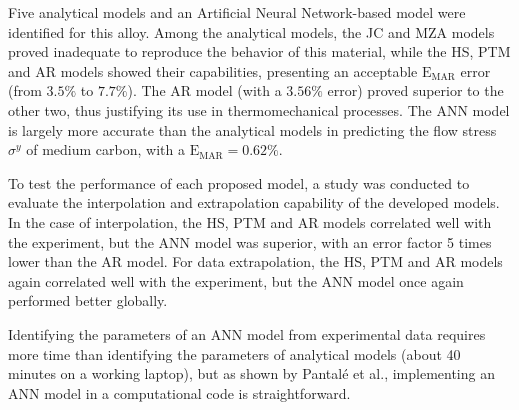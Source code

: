 \documentclass[metals,article,submit,pdftex,moreauthors]{Definitions/mdpi}
\makeatletter
\DeclareRobustCommand{\eal}{et al.\@\xspace}
\DeclareRobustCommand{\MARE}{\text{E}_\text{MAR}}
\makeatother
\begin{document}
Five analytical models and an Artificial Neural Network-based model were identified for this alloy.
Among the analytical models, the JC and MZA models proved inadequate to reproduce the behavior of this material, while the HS, PTM and AR models showed their capabilities, presenting an acceptable $\MARE$ error (from $3.5\%$ to $7.7\%$).
The AR model (with a $3.56\%$ error) proved superior to the other two, thus justifying its use in thermomechanical processes.
The ANN model is largely more accurate than the analytical models in predicting the flow stress $\sigma^y$ of medium carbon, with a $\MARE=0.62\%$.

To test the performance of each proposed model, a study was conducted to evaluate the interpolation and extrapolation capability of the developed models.
In the case of interpolation, the HS, PTM and AR models correlated well with the experiment, but the ANN model was superior, with an error factor 5 times lower than the AR model.
For data extrapolation, the HS, PTM and AR models again correlated well with the experiment, but the ANN model once again performed better globally.

Identifying the parameters of an ANN model from experimental data requires more time than identifying the parameters of analytical models (about 40 minutes on a working laptop), but as shown by Pantalé \eal \cite{Pantale-2021, Pantale-2023}, implementing an ANN model in a computational code is straightforward.

\vspace{6pt} 



\end{document}
